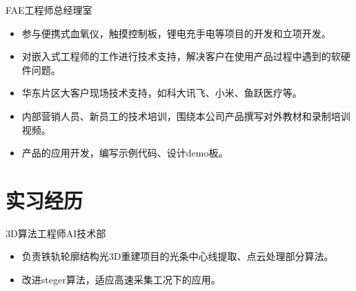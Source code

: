 \documentclass{resume}
\begin{document}
FAE工程师\qquad 总经理室
\begin{itemize}
  
  \item 参与便携式血氧仪，触摸控制板，锂电充手电等项目的开发和立项开发。
  \item 对嵌入式工程师的工作进行技术支持，解决客户在使用产品过程中遇到的软硬件问题。
  \item 华东片区大客户现场技术支持，如科大讯飞、小米、鱼跃医疗等。 
  \item 内部营销人员、新员工的技术培训，围绕本公司产品撰写对外教材和录制培训视频。
  \item 产品的应用开发，编写示例代码、设计demo板。
\end{itemize}
\section{\textcolor[RGB]{50,50,190}{\faAlignLeft 实习经历}}

3D算法工程师\qquad \qquad \quad AI技术部
\begin{itemize}
  \item 负责铁轨轮廓结构光3D重建项目的光条中心线提取、点云处理部分算法。
  \item 改进steger算法，适应高速采集工况下的应用。
\end{itemize}


\end{document}
